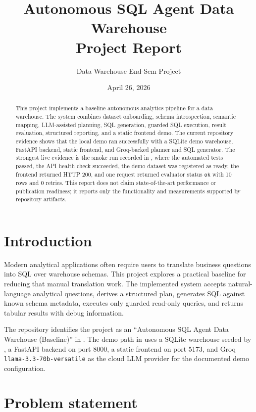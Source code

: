 \documentclass[12pt,a4paper]{article}
\title{Autonomous SQL Agent Data Warehouse\\Project Report}
\author{Data Warehouse End-Sem Project}
\date{April 26, 2026}
\begin{document}
\maketitle

\begin{abstract}
This project implements a baseline autonomous analytics pipeline for a data warehouse. The system combines dataset onboarding, schema introspection, semantic mapping, LLM-assisted planning, SQL generation, guarded SQL execution, result evaluation, structured reporting, and a static frontend demo. The current repository evidence shows that the local demo ran successfully with a SQLite demo warehouse, FastAPI backend, static frontend, and Groq-backed planner and SQL generator. The strongest live evidence is the smoke run recorded in , where the automated tests passed, the API health check succeeded, the demo dataset was registered as ready, the frontend returned HTTP 200, and one  request returned evaluator status \texttt{ok} with 10 rows and 0 retries. This report does not claim state-of-the-art performance or publication readiness; it reports only the functionality and measurements supported by repository artifacts.
\end{abstract}

\tableofcontents
\newpage

\section{Introduction}

Modern analytical applications often require users to translate business questions into SQL over warehouse schemas. This project explores a practical baseline for reducing that manual translation work. The implemented system accepts natural-language analytical questions, derives a structured plan, generates SQL against known schema metadata, executes only guarded read-only queries, and returns tabular results with debug information.

The repository identifies the project as an ``Autonomous SQL Agent Data Warehouse (Baseline)'' in . The demo path in  uses a SQLite warehouse seeded by , a FastAPI backend on port 8000, a static frontend on port 5173, and Groq \texttt{llama-3.3-70b-versatile} as the cloud LLM provider for the documented demo configuration.

\section{Problem statement}
\end{document}
